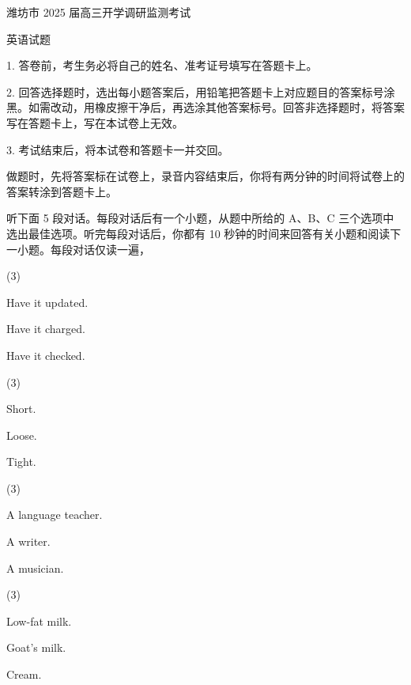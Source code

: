 \documentclass{英语试卷}
\begin{document}
\par 潍坊市 2025 届高三开学调研监测考试\par
\par 英语试题\par
\begin{notice}
\par 1. 答卷前，考生务必将自己的姓名、准考证号填写在答题卡上。\par
\par 2. 回答选择题时，选出每小题答案后，用铅笔把答题卡上对应题目的答案标号涂黑。如需改动，用橡皮擦干净后，再选涂其他答案标号。回答非选择题时，将答案写在答题卡上，写在本试卷上无效。\par
\par 3. 考试结束后，将本试卷和答题卡一并交回。\par
\end{notice}
\par 做题时，先将答案标在试卷上，录音内容结束后，你将有两分钟的时间将试卷上的答案转涂到答题卡上。\par
{}
\par 听下面 5 段对话。每段对话后有一个小题，从题中所给的 A、B、C 三个选项中选出最佳选项。听完每段对话后，你都有 10 秒钟的时间来回答有关小题和阅读下一小题。每段对话仅读一遍，\par
{}
\begin{choices}(3)
  \item Have it updated.
  \item Have it charged.
  \item Have it checked.
\end{choices}
\begin{choices}(3)
  \item Short.
  \item Loose.
  \item Tight.
\end{choices}
\begin{choices}(3)
  \item A language teacher.
  \item A writer.
  \item A musician.
\end{choices}
\begin{choices}(3)
  \item Low-fat milk.
  \item Goat's milk.
  \item Cream.
\end{choices}
\end{document}
